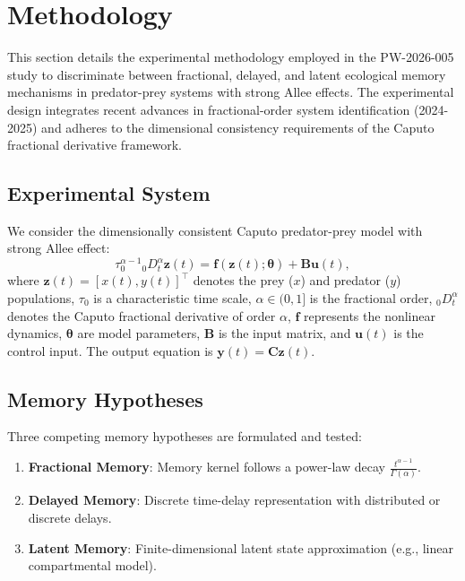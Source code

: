 \section{Methodology}
\label{sec:methodology}

This section details the experimental methodology employed in the PW-2026-005 study to discriminate between fractional, delayed, and latent ecological memory mechanisms in predator-prey systems with strong Allee effects. The experimental design integrates recent advances in fractional-order system identification (2024-2025) and adheres to the dimensional consistency requirements of the Caputo fractional derivative framework.

\subsection{Experimental System}
We consider the dimensionally consistent Caputo predator-prey model with strong Allee effect:
\begin{equation}
\label{eq:system}
\tau_0^{\alpha-1} {}_0D_t^\alpha \mathbf{z}(t) = \mathbf{f}(\mathbf{z}(t);\boldsymbol{\theta}) + \mathbf{B}\mathbf{u}(t),
\end{equation}
where $\mathbf{z}(t) = [x(t), y(t)]^\top$ denotes the prey ($x$) and predator ($y$) populations, $\tau_0$ is a characteristic time scale, $\alpha \in (0,1]$ is the fractional order, ${}_0D_t^\alpha$ denotes the Caputo fractional derivative of order $\alpha$, $\mathbf{f}$ represents the nonlinear dynamics, $\boldsymbol{\theta}$ are model parameters, $\mathbf{B}$ is the input matrix, and $\mathbf{u}(t)$ is the control input. The output equation is $\mathbf{y}(t) = \mathbf{C}\mathbf{z}(t)$.

\subsection{Memory Hypotheses}
Three competing memory hypotheses are formulated and tested:
\begin{enumerate}
    \item \textbf{Fractional Memory}: Memory kernel follows a power-law decay $\frac{t^{\alpha-1}}{\Gamma(\alpha)}$.
    \item \textbf{Delayed Memory}: Discrete time-delay representation with distributed or discrete delays.
    \item \textbf{Latent Memory}: Finite-dimensional latent state approximation (e.g., linear compartmental model).
\end{enumerate}

